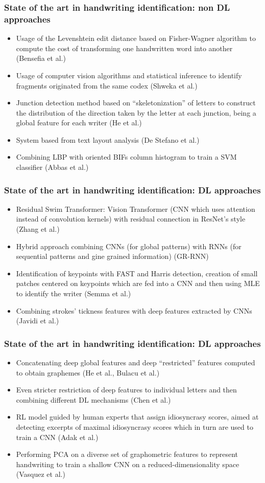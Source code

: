 \documentclass{beamer}
\begin{document}
\begin{frame}
	\frametitle{State of the art in handwriting identification: non DL approaches}
	\begin{itemize}
		\item Usage of the Levenshtein edit distance based on Fisher-Wagner algorithm to compute the cost of transforming one handwritten word into another (Bensefia et al.)
		\item Usage of computer vision algorithms and statistical inference to identify fragments originated from the same codex (Shweka et al.)
		\item Junction detection method based on ``skeletonization'' of letters to construct the distribution of the direction taken by the letter at each junction, being a global feature for each writer (He et al.)
		\item System based from text layout analysis (De Stefano et al.)
		\item Combining LBP with oriented BIFs column histogram to train a SVM classifier (Abbas et al.)
	\end{itemize}
\end{frame}
\begin{frame}
	\frametitle{State of the art in handwriting identification: DL approaches}
	\begin{itemize}
		\item Residual Swim Transformer: Vision Transformer (CNN which uses attention instead of convolution kernels) with residual connection in ResNet's style (Zhang et al.)
		\item Hybrid approach combining CNNs (for global patterns) with RNNs (for sequential patterns and gine grained information) (GR-RNN)
		\item Identification of keypoints with FAST and Harris detection, creation of small patches centered on keypoints which are fed into a CNN and then using MLE to identify the writer (Semma et al.)
		\item Combining strokes' tickness features with deep features extracted by CNNs (Javidi et al.)
	\end{itemize}
\end{frame}
\begin{frame}
	\frametitle{State of the art in handwriting identification: DL approaches}
	\begin{itemize}
		\item Concatenating deep global features and deep ``restricted'' features computed to obtain graphemes (He et al., Bulacu et al.)
		\item Even stricter restriction of deep features to individual letters and then combining different DL mechanisms (Chen et al.)
		\item RL model guided by human experts that assign idiosyncrasy scores, aimed at detecting excerpts of  maximal idiosyncrasy scores which in turn are used to train a CNN (Adak et al.)
		\item Performing PCA on a diverse set of graphometric features to represent handwriting to train a shallow CNN on a reduced-dimensionality space (Vasquez et al.)
	\end{itemize}
\end{frame}
\end{document}
